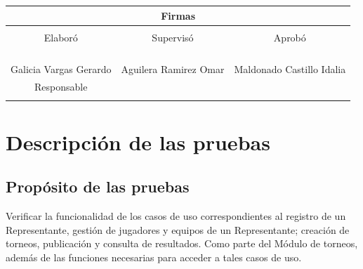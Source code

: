 \documentclass[oneside,10pt]{book}
\begin{document}
\begin{table}[]
\centering
\label{my-label}
\begin{tabularx}{\textwidth}{ X X X }
\multicolumn{3}{c}{\cellcolor[HTML]{CBCEFB}Firmas}                                                                                         \\ \hline
\multicolumn{1}{|X|}{ } & \multicolumn{1}{X|}{ } & \multicolumn{1}{X|}{ } \\
\multicolumn{1}{|c|}{Elaboró} 		& \multicolumn{1}{c|}{Supervisó}                   		& \multicolumn{1}{c|}{Aprobó} \\
\multicolumn{1}{|X|}{ } & \multicolumn{1}{X|}{ } & \multicolumn{1}{X|}{ } \\
\multicolumn{1}{|X|}{ } & \multicolumn{1}{X|}{ } & \multicolumn{1}{X|}{ } \\
\multicolumn{1}{|X|}{ } & \multicolumn{1}{X|}{ } & \multicolumn{1}{X|}{ } \\
\multicolumn{1}{|X|}{ } & \multicolumn{1}{X|}{ } & \multicolumn{1}{X|}{ } \\ \hline
\multicolumn{1}{|c|}{Galicia Vargas Gerardo}   	& \multicolumn{1}{c|}{Aguilera Ramirez Omar} 	& \multicolumn{1}{c|}{Maldonado Castillo Idalia} 	\\
\multicolumn{1}{|c|}{Responsable}   	& \multicolumn{1}{c|}{ } 	& \multicolumn{1}{c|}{ } \\
\multicolumn{1}{|X|}{ } & \multicolumn{1}{X|}{ } & \multicolumn{1}{X|}{ } \\ \hline
\end{tabularx}
\end{table}

\thispagestyle{empty}

\frontmatter
\tableofcontents

\mainmatter

\chapter{Descripción de las pruebas}

\section{Propósito de las pruebas}

	Verificar la funcionalidad de los casos de uso correspondientes al registro de un Representante, gestión de jugadores y equipos de un Representante; creación de torneos, publicación y consulta de resultados. Como parte del Módulo de torneos, además de las funciones necesarias para acceder a tales casos de uso.
	
\end{document}
